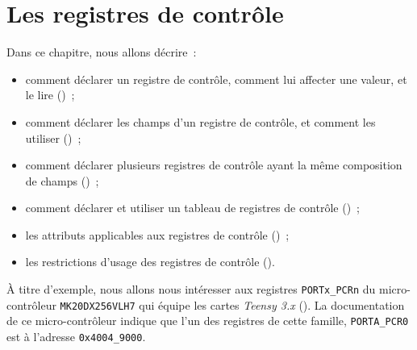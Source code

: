 

\chapter{Les registres de contrôle}



Dans ce chapitre, nous allons décrire~:
\begin{itemize}
  \item comment déclarer un registre de contrôle, comment lui affecter une valeur, et le lire ()~;
  \item comment déclarer les champs d'un registre de contrôle, et comment les utiliser ()~;
  \item comment déclarer plusieurs registres de contrôle ayant la même composition de champs ()~;
  \item comment déclarer et utiliser un tableau de registres de contrôle ()~;
  \item les attributs applicables aux registres de contrôle ()~;
  \item les restrictions d'usage des registres de contrôle ().
\end{itemize}

À titre d'exemple, nous allons nous intéresser aux registres \texttt{PORTx\_PCRn} du micro-contrôleur \texttt{MK20DX256VLH7} qui équipe les cartes \emph{Teensy 3.x} (). La documentation de ce micro-contrôleur indique que l'un des registres de cette famille, \texttt{PORTA\_PCR0} est à l'adresse \texttt{0x4004\_9000}.


